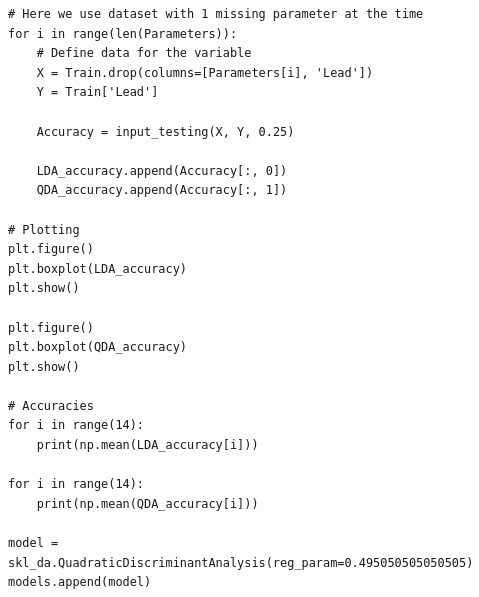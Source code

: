 \documentclass{article}
\begin{document}
\begin{verbatim}
# Here we use dataset with 1 missing parameter at the time
for i in range(len(Parameters)):
    # Define data for the variable
    X = Train.drop(columns=[Parameters[i], 'Lead'])
    Y = Train['Lead']

    Accuracy = input_testing(X, Y, 0.25)

    LDA_accuracy.append(Accuracy[:, 0])
    QDA_accuracy.append(Accuracy[:, 1])

# Plotting
plt.figure()
plt.boxplot(LDA_accuracy)
plt.show()

plt.figure()
plt.boxplot(QDA_accuracy)
plt.show()

# Accuracies
for i in range(14):
    print(np.mean(LDA_accuracy[i]))

for i in range(14):
    print(np.mean(QDA_accuracy[i]))

model = skl_da.QuadraticDiscriminantAnalysis(reg_param=0.495050505050505)
models.append(model)

\end{verbatim}
\end{document}
